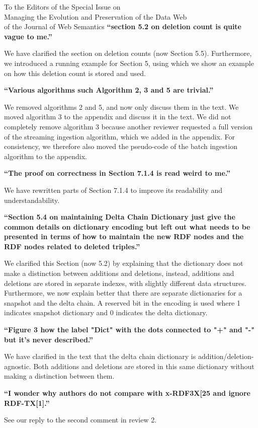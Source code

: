 \documentclass{letter}
\newcounter{section}
\begin{document}
\begin{letter}{To the Editors of the Special Issue on\\Managing the Evolution and Preservation of the Data Web\\of the Journal of Web Semantics}
\textbf{\enquote{section 5.2 on deletion count is quite vague to me.}}

We have clarified the section on deletion counts (now Section 5.5).
Furthermore, we introduced a running example for Section 5,
using which we show an example on how this deletion count is stored and used.

\textbf{\enquote{Various algorithms such Algorithm 2, 3 and 5 are trivial.}}

We removed algorithms 2 and 5, and now only discuss them in the text.
We moved algorithm 3 to the appendix and discuss it in the text.
We did not completely remove algorithm 3 because another reviewer requested
a full version of the streaming ingestion algorithm, which we added in the appendix.
For consistency, we therefore also moved the pseudo-code of the batch ingestion algorithm to the appendix.

\textbf{\enquote{The proof on correctness in Section 7.1.4 is read weird to me.}}

We have rewritten parts of Section 7.1.4 to improve its readability and understandability.

\textbf{\enquote{Section 5.4 on maintaining Delta Chain Dictionary just give the common details on dictionary encoding but left out what needs to be presented in terms of how to maintain the new RDF nodes and the RDF nodes related to deleted triples.}}

We clarified this Section (now 5.2) by explaining that the dictionary does not make a distinction between additions and deletions,
instead, additions and deletions are stored in separate indexes, with slightly different data structures.
Furthermore, we now explain better that there are separate dictionaries for a snapshot and the delta chain.
A reserved bit in the encoding is used where 1 indicates snapshot dictionary and 0 indicates the delta dictionary.

\textbf{\enquote{Figure 3 how the label "Dict" with the dots connected to "+" and "-" but it's never described.}}

We have clarified in the text that the delta chain dictionary is addition/deletion-agnostic.
Both additions and deletions are stored in this same dictionary without making a distinction between them.

\textbf{\enquote{I wonder why authors do not compare with x-RDF3X[25 and ignore RDF-TX[1].}}

See our reply to the second comment in review 2.

\pagebreak

\end{letter}
\end{document}
